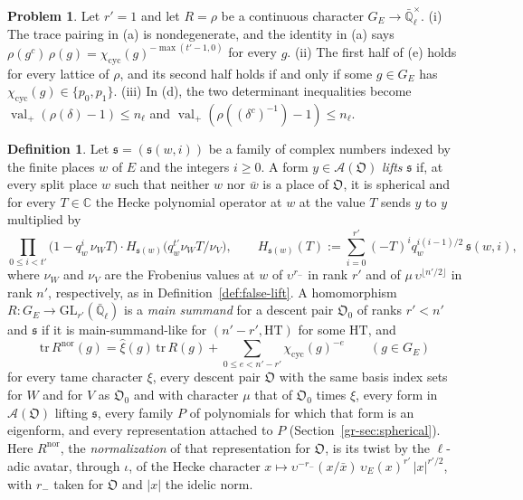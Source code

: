 \documentclass[reqno]{amsart}
\theoremstyle{definition}
\newtheorem{problem}{Problem}[section]
\newtheorem{definition}{Definition}[section]
\theoremstyle{plain}
\newcommand{\Q}{\mathbb{Q}}
\newcommand{\C}{\mathbb{C}}
\newcommand{\GL}{\mathrm{GL}}
\newcommand{\cyc}{\chi_{\mathrm{cyc}}}
\newcommand{\DP}{\mathfrak{O}}
\newcommand{\val}{\operatorname{val}}
\newcommand{\HT}{\mathrm{HT}}
\begin{document}
\begin{problem}\label{pr:rank-one}
Let \(r' = 1\) and let \(R = \rho\) be a continuous character \(G_E \to \bar{\Q}_\ell^\times\).  (i) The trace pairing in (a) is nondegenerate, and the identity in (a) says \(\rho(g^c)\,\rho(g) = \cyc(g)^{-\max(t'-1,0)}\) for every \(g\).  (ii) The first half of (e) holds for every lattice of \(\rho\), and its second half holds if and only if some \(g \in G_E\) has \(\cyc(g) \in \{p_0, p_1\}\).  (iii) In (d), the two determinant inequalities become \(\val_+(\rho(\delta) - 1) \le n_\ell\) and \(\val_+(\rho((\delta^c)^{-1}) - 1) \le n_\ell\).
\end{problem}

\begin{definition}\label{def:main-summand}
Let \(\mathfrak s = (\mathfrak s(w,i))\) be a family of complex numbers indexed by the finite places \(w\) of \(E\) and the integers \(i \ge 0\).  A form \(y \in \mathcal A(\DP)\) \emph{lifts} \(\mathfrak s\) if, at every split place \(w\) such that neither \(w\) nor \(\bar w\) is a place of \(\DP\), it is spherical and for every \(T \in \C\) the Hecke polynomial operator at \(w\) at the value \(T\) sends \(y\) to \(y\) multiplied by
\[
  \prod_{0 \le i < t'}\bigl(1 - q_w^i\,\nu_W T\bigr)\cdot H_{\mathfrak s(w)}\bigl(q_w^{t'}\nu_W T/\nu_V\bigr), \qquad H_{\mathfrak s(w)}(T) := \sum_{i=0}^{r'} (-T)^i q_w^{i(i-1)/2}\,\mathfrak s(w,i) ,
\]
where \(\nu_W\) and \(\nu_V\) are the Frobenius values at \(w\) of \(\upsilon^{r_-}\) in rank \(r'\) and of \(\mu\,\upsilon^{\lfloor n'/2\rfloor}\) in rank \(n'\), respectively, as in Definition~\ref{def:false-lift}.  A homomorphism \(R \colon G_E \to \GL_{r'}(\bar{\Q}_\ell)\) is a \emph{main summand} for a descent pair \(\DP_0\) of ranks \(r' < n'\) and \(\mathfrak s\) if it is main-summand-like for \((n' - r', \HT)\) for some \(\HT\), and
\[
  \mathrm{tr}\,R^{\mathrm{nor}}(g) = \hat\xi(g)\,\mathrm{tr}\,R(g) + \sum_{0 \le e < n'-r'} \cyc(g)^{-e} \qquad (g \in G_E)
\]
for every tame character \(\xi\), every descent pair \(\DP\) with the same basis index sets for \(W\) and for \(V\) as \(\DP_0\) and with character \(\mu\) that of \(\DP_0\) times \(\xi\), every form in \(\mathcal A(\DP)\) lifting \(\mathfrak s\), every family \(P\) of polynomials for which that form is an eigenform, and every representation attached to \(P\) (Section~\ref{gr-sec:spherical}).  Here \(R^{\mathrm{nor}}\), the \emph{normalization} of that representation for \(\DP\), is its twist by the \(\ell\)-adic avatar, through \(\iota\), of the Hecke character \(x\mapsto\upsilon^{-r_-}(x/\bar x)\,\upsilon_E(x)^{r'}\,|x|^{r'/2}\), with \(r_-\) taken for \(\DP\) and \(|x|\) the idelic norm.
\end{definition}
\end{document}
